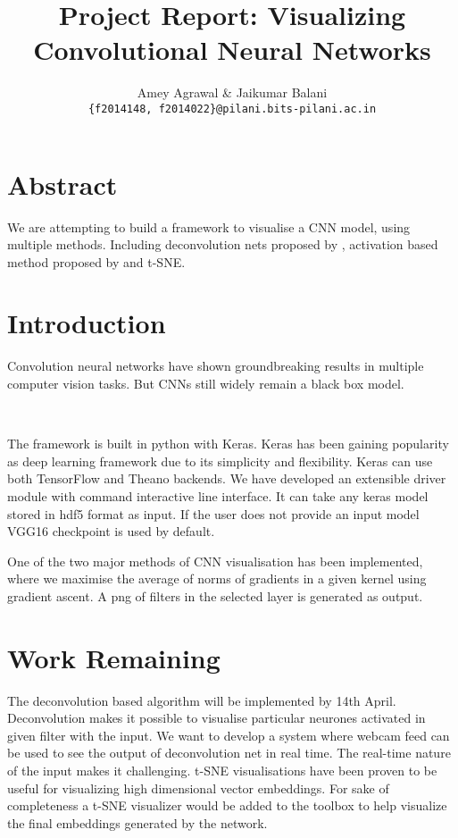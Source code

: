 \documentclass{article} %
\title{ Project Report: Visualizing Convolutional Neural
Networks }
\author{
Amey Agrawal \& Jaikumar Balani \\
\texttt{\{f2014148, f2014022\}@pilani.bits-pilani.ac.in} \\
}
\begin{document}
\maketitle

\section{Abstract}

We are attempting to build a framework to visualise a CNN model,
using multiple methods. Including deconvolution nets
proposed by \citet{zeiler2014visualizing}, activation based method
proposed by \citet{erhan2009visualizing} and t-SNE.


\section{Introduction}

Convolution neural networks have shown groundbreaking results in multiple
computer vision tasks. But CNNs still widely remain a black box model.


\

The framework is built in python with Keras. Keras has been gaining popularity
as deep learning framework due to its simplicity and flexibility. Keras can use
both TensorFlow and Theano backends. We have developed an extensible driver
module with command interactive line interface. It can take any keras model
stored in hdf5 format as input. If the user does not provide an input model VGG16
checkpoint is used by default.

One of the two major methods of CNN visualisation has been implemented, where
we maximise the average of norms of gradients in a given kernel using gradient
ascent. A png of filters in the selected layer is generated as output.

\section{Work Remaining}

The deconvolution based algorithm will be implemented by 14th April.
Deconvolution makes it possible to visualise particular neurones activated in
given filter with the input. We want to develop a system where webcam feed can be used
to see the output of deconvolution net in real time. The real-time nature of the
input makes it challenging. t-SNE visualisations have been proven to be
useful for visualizing high dimensional vector embeddings. For sake of
completeness a t-SNE visualizer would be added to the toolbox to help
visualize the final embeddings generated by the network.




\end{document}
